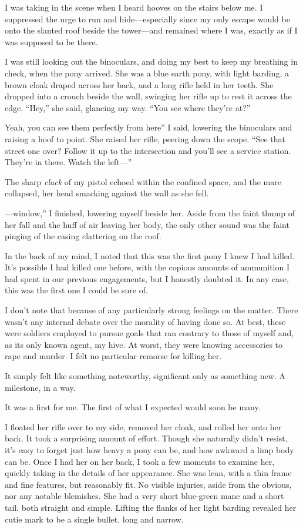 I was taking in the scene when I heard hooves on the stairs below me. I suppressed the urge to run and hide—especially since my only escape would be onto the slanted roof beside the tower—and remained where I was, exactly as if I was supposed to be there.

I was still looking out the binoculars, and doing my best to keep my breathing in check, when the pony arrived. She was a blue earth pony, with light barding, a brown cloak draped across her back, and a long rifle held in her teeth. She dropped into a crouch beside the wall, swinging her rifle up to rest it across the edge. “Hey,” she said, glancing my way. “You see where they’re at?”

\leavevmode{}Yeah, you can see them perfectly from here” I said, lowering the binoculars and raising a hoof to point. She raised her rifle, peering down the scope. “See that street one over? Follow it up to the intersection and you’ll see a service station. They’re in there. Watch the left—”

The sharp \textit{clack} of my pistol echoed within the confined space, and the mare collapsed, her head smacking against the wall as she fell.

\leavevmode{}—window,” I finished, lowering myself beside her. Aside from the faint thump of her fall and the huff of air leaving her body, the only other sound was the faint pinging of the casing clattering on the roof.

In the back of my mind, I noted that this was the first pony I knew I had killed. It’s possible I had killed one before, with the copious amounts of ammunition I had spent in our previous engagements, but I honestly doubted it. In any case, this was the first one I could be sure of.

I don’t note that because of any particularly strong feelings on the matter. There wasn’t any internal debate over the morality of having done so. At best, these were soldiers employed to pursue goals that ran contrary to those of myself and, as its only known agent, my hive. At worst, they were knowing accessories to rape and murder. I felt no particular remorse for killing her.

It simply felt like something noteworthy, significant only as something new. A milestone, in a way.

It was a first for me. The first of what I expected would soon be many.

I floated her rifle over to my side, removed her cloak, and rolled her onto her back. It took a surprising amount of effort. Though she naturally didn’t resist, it’s easy to forget just how heavy a pony can be, and how awkward a limp body can be. Once I had her on her back, I took a few moments to examine her, quickly taking in the details of her appearance. She was lean, with a thin frame and fine features, but reasonably fit. No visible injuries, aside from the obvious, nor any notable blemishes. She had a very short blue-green mane and a short tail, both straight and simple. Lifting the flanks of her light barding revealed her cutie mark to be a single bullet, long and narrow.

